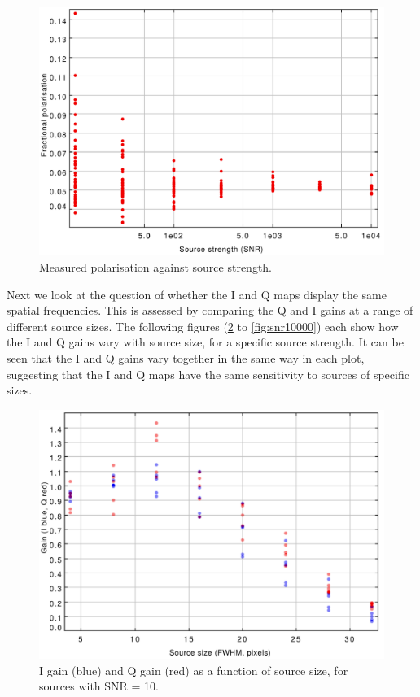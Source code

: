 \documentclass[twoside,11pt]{starlink}
\begin{document}
\begin{figure}
\includegraphics[width=0.9\columnwidth]{figs/polsnr}
\caption{Measured polarisation against source strength.}
\label{fig:polsnr}
\end{figure}


Next we look at the question of whether the I and Q maps display the same
spatial frequencies. This is assessed by comparing the Q and I gains at a
range of different source sizes. The following figures (\ref{fig:snr10}
to \ref{fig:snr10000}) each show how the I and Q gains vary with source
size, for a specific source strength. It can be seen that the I and Q
gains vary together in the same way in each plot, suggesting that the I
and Q maps have the same sensitivity to sources of specific sizes.


\begin{figure}
\includegraphics[width=0.9\columnwidth]{figs/snr10}
\caption{I gain (blue) and Q gain (red) as a function of source size, for
sources with SNR = 10.}
\label{fig:snr10}
\end{figure}
\end{document}
